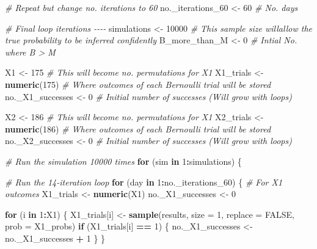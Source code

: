 \documentclass[
]{article}
\newenvironment{Shaded}{\begin{snugshade}}{\end{snugshade}}
\newcommand{\AttributeTok}[1]{\textcolor[rgb]{0.13,0.29,0.53}{#1}}
\newcommand{\CommentTok}[1]{\textcolor[rgb]{0.56,0.35,0.01}{\textit{#1}}}
\newcommand{\ConstantTok}[1]{\textcolor[rgb]{0.56,0.35,0.01}{#1}}
\newcommand{\ControlFlowTok}[1]{\textcolor[rgb]{0.13,0.29,0.53}{\textbf{#1}}}
\newcommand{\DecValTok}[1]{\textcolor[rgb]{0.00,0.00,0.81}{#1}}
\newcommand{\FunctionTok}[1]{\textcolor[rgb]{0.13,0.29,0.53}{\textbf{#1}}}
\newcommand{\NormalTok}[1]{#1}
\newcommand{\OtherTok}[1]{\textcolor[rgb]{0.56,0.35,0.01}{#1}}
\newcommand{\SpecialCharTok}[1]{\textcolor[rgb]{0.81,0.36,0.00}{\textbf{#1}}}
\begin{document}
\begin{Shaded}
\begin{Highlighting}[]
\CommentTok{\# Repeat but change no. iterations to 60}
\NormalTok{no.\_iterations\_60 }\OtherTok{\textless{}{-}} \DecValTok{60}  \CommentTok{\# No. days }

\CommentTok{\# Final loop iterations {-}{-}{-}{-}}
\NormalTok{simulations }\OtherTok{\textless{}{-}} \DecValTok{10000}  \CommentTok{\# This sample size willallow the true probability to be inferred confidently}
\NormalTok{B\_more\_than\_M }\OtherTok{\textless{}{-}} \DecValTok{0}  \CommentTok{\# Intial No. where B \textgreater{} M}


\NormalTok{X1 }\OtherTok{\textless{}{-}} \DecValTok{175}  \CommentTok{\# This will become no. permutations for X1}
\NormalTok{X1\_trials }\OtherTok{\textless{}{-}} \FunctionTok{numeric}\NormalTok{(}\DecValTok{175}\NormalTok{)  }\CommentTok{\# Where outcomes of each Bernoulli trial will be stored}
\NormalTok{no.\_X1\_successes }\OtherTok{\textless{}{-}} \DecValTok{0}  \CommentTok{\# Initial number of successes (Will grow with loops)}

\NormalTok{X2 }\OtherTok{\textless{}{-}} \DecValTok{186}  \CommentTok{\# This will become no. permutations for X1}
\NormalTok{X2\_trials }\OtherTok{\textless{}{-}} \FunctionTok{numeric}\NormalTok{(}\DecValTok{186}\NormalTok{)  }\CommentTok{\# Where outcomes of each Bernoulli trial will be stored}
\NormalTok{no.\_X2\_successes }\OtherTok{\textless{}{-}} \DecValTok{0}  \CommentTok{\# Initial number of successes (Will grow with loops)}



\CommentTok{\# Run the simulation 10000 times}
\ControlFlowTok{for}\NormalTok{ (sim }\ControlFlowTok{in} \DecValTok{1}\SpecialCharTok{:}\NormalTok{simulations) \{}
  
  \CommentTok{\# Run the 14{-}iteration loop}
  \ControlFlowTok{for}\NormalTok{ (day }\ControlFlowTok{in} \DecValTok{1}\SpecialCharTok{:}\NormalTok{no.\_iterations\_60) \{}
    \CommentTok{\# For X1 outcomes}
\NormalTok{    X1\_trials }\OtherTok{\textless{}{-}} \FunctionTok{numeric}\NormalTok{(X1)}
\NormalTok{    no.\_X1\_successes }\OtherTok{\textless{}{-}} \DecValTok{0}
    
    \ControlFlowTok{for}\NormalTok{ (i }\ControlFlowTok{in} \DecValTok{1}\SpecialCharTok{:}\NormalTok{X1) \{}
\NormalTok{      X1\_trials[i] }\OtherTok{\textless{}{-}} \FunctionTok{sample}\NormalTok{(results, }\AttributeTok{size =} \DecValTok{1}\NormalTok{, }\AttributeTok{replace =} \ConstantTok{FALSE}\NormalTok{, }\AttributeTok{prob =}\NormalTok{ X1\_probs)}
      \ControlFlowTok{if}\NormalTok{ (X1\_trials[i] }\SpecialCharTok{==} \DecValTok{1}\NormalTok{) \{}
\NormalTok{        no.\_X1\_successes }\OtherTok{\textless{}{-}}\NormalTok{ no.\_X1\_successes }\SpecialCharTok{+} \DecValTok{1}
\NormalTok{      \}}
\NormalTok{    \}}
    

\end{Highlighting}
\end{Shaded}
\end{document}

